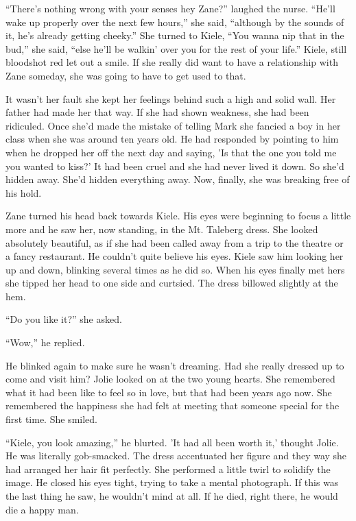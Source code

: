 ``There's nothing wrong with your senses hey Zane?'' laughed the nurse.  ``He'll wake up properly over the next few hours,'' she said, ``although by the sounds of it, he's already getting cheeky.''  She turned to Kiele, ``You wanna nip that in the bud,'' she said, ``else he'll be walkin' over you for the rest of your life.''  Kiele, still bloodshot red let out a smile.  If she really did want to have a relationship with Zane someday, she was going to have to get used to that.  

It wasn't her fault she kept her feelings behind such a high and solid wall.  Her father had made her that way.  If she had shown weakness, she had been ridiculed.  Once she'd made the mistake of telling Mark she fancied a boy in her class when she was around ten years old.  He had responded by pointing to him when he dropped her off the next day and saying, 'Is that the one you told me you wanted to kiss?'  It had been cruel and she had never lived it down.  So she'd hidden away.  She'd hidden everything away.  Now, finally, she was breaking free of his hold.

Zane turned his head back towards Kiele.  His eyes were beginning to focus a little more and he saw her, now standing, in the Mt. Taleberg dress.  She looked absolutely beautiful, as if she had been called away from a trip to the theatre or a fancy restaurant.  He couldn't quite believe his eyes.  Kiele saw him looking her up and down, blinking several times as he did so.  When his eyes finally met hers she tipped her head to one side and curtsied.  The dress billowed slightly at the hem.

``Do you like it?'' she asked.

``Wow,'' he replied.  

He blinked again to make sure he wasn't dreaming.  Had she really dressed up to come and visit him?  Jolie looked on at the two young hearts.  She remembered what it had been like to feel so in love, but that had been years ago now.  She remembered the happiness she had felt at meeting that someone special for the first time. She smiled.  

``Kiele, you look amazing,'' he blurted.  'It had all been worth it,' thought Jolie.  He was literally gob-smacked.  The dress accentuated her figure and they way she had arranged her hair fit perfectly.  She performed a little twirl to solidify the image.  He closed his eyes tight, trying to take a mental photograph.  If this was the last thing he saw, he wouldn't mind at all.  If he died, right there, he would die a happy man.  

